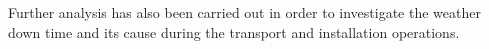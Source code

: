 Further analysis has also been carried out in order to investigate the weather down time and its cause during the transport and installation operations.  